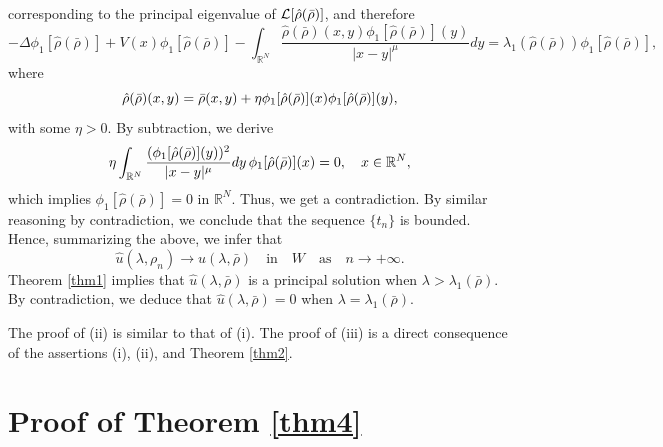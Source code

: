 \documentclass[12pt,thmsa]{article}
\begin{document}
corresponding to the principal eigenvalue of $\mathcal{L}[\hat{\rho}(\bar{%
\rho})]$, and therefore
\begin{equation*}
-\Delta \phi _{1}[\hat{\rho}(\bar{\rho})]+V(x)\phi _{1}[\hat{\rho}(\bar{\rho}%
)]-\int_{\mathbb{R}^{N}}\frac{\hat{\rho}(\bar{\rho})(x,y)\phi _{1}[\hat{\rho}%
(\bar{\rho})](y)}{|x-y|^{\mu }}dy=\lambda _{1}(\hat{\rho}(\bar{\rho}))\phi
_{1}[\hat{\rho}(\bar{\rho})],  \label{eq:eigenP2}
\end{equation*}%
where
\begin{equation*}
\hat{\rho}(\bar{\rho})(x,y)=\bar{\rho}(x,y)+\eta \phi _{1}[\hat{\rho}(\bar{%
\rho})](x)\phi _{1}[\hat{\rho}(\bar{\rho})](y),
\end{equation*}%
with some $\eta >0$. By subtraction, we derive
\begin{equation*}
\eta \int_{\mathbb{R}^{N}}\frac{(\phi _{1}[\hat{\rho}(\bar{\rho})](y))^{2}}{%
|x-y|^{\mu }}dy\,\phi _{1}[\hat{\rho}(\bar{\rho})](x)=0,\quad x\in \mathbb{R}%
^{N},
\end{equation*}%
which implies $\phi _{1}[\hat{\rho}(\bar{\rho})]=0$ in $\mathbb{R}^{N}$.
Thus, we get a contradiction. By similar reasoning by contradiction, we
conclude that the sequence $\{t_{n}\}$ is bounded. Hence, summarizing the
above, we infer that
\begin{equation*}
\hat{u}(\lambda ,\rho _{n})\rightarrow \hat{u}(\lambda ,\bar{\rho})\quad
\text{in}\quad W\quad \text{as}\quad n\rightarrow +\infty .
\end{equation*}%
Theorem \ref{thm1} implies that $\hat{u}(\lambda ,\bar{\rho})$ is a
principal solution when $\lambda >\lambda _{1}(\bar{\rho})$. By
contradiction, we deduce that $\hat{u}(\lambda ,\bar{\rho})=0$ when $\lambda
=\lambda _{1}(\bar{\rho})$.

The proof of (ii) is similar to that of (i). The proof of (iii) is a direct
consequence of the assertions (i), (ii), and Theorem \ref{thm2}.

\section{Proof of Theorem \protect\ref{thm4}}
\end{document}
